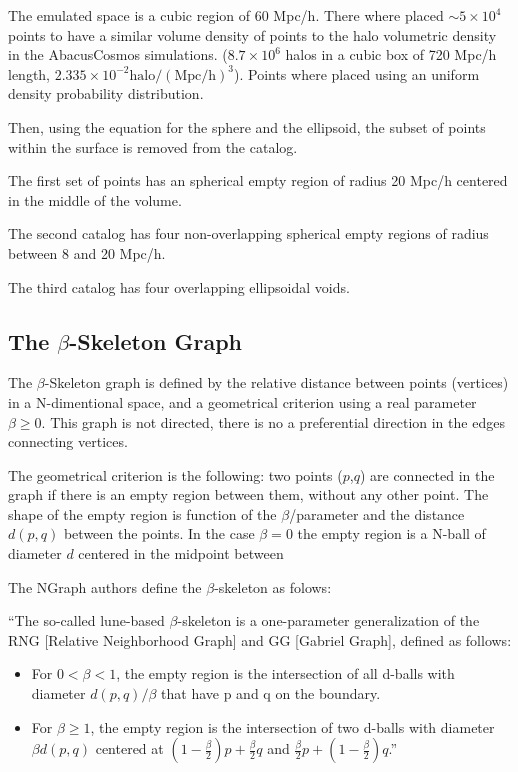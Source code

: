 \documentclass[preprint]{aastex62}
\begin{document}
The emulated space is a cubic region of 60 Mpc/h.
There where placed $\sim 5 \times10^4$ points to have a similar
volume density of points to the halo volumetric density in
the AbacusCosmos simulations. ($8.7\times10^6$ halos in a cubic
box of 720 Mpc/h length,
$2.335\times10^{-2}\mathrm{halo/(Mpc/h)^3}$).
Points where placed using an uniform density probability distribution.

Then, using the equation for the sphere and the ellipsoid, the subset
of points within the surface is removed from the catalog.

The first set of points has an spherical empty region of radius
20 Mpc/h centered in the middle of the volume.

The second catalog has four non-overlapping spherical empty
regions of radius between 8 and 20 Mpc/h.

The third catalog has four overlapping ellipsoidal voids.

\subsection{The $\beta$-Skeleton Graph}

The $\beta$-Skeleton graph is defined by the relative distance
between points (vertices) in a N-dimentional space, and a
geometrical criterion using a real
parameter $\beta\geq 0$. This graph is not directed, there is no
a preferential direction in the edges connecting vertices.

The geometrical criterion is the following:
two points ($p$,$q$) are connected in the graph if there is an empty region
between them, without any other point. The shape of the empty region
is function of the $\beta$/parameter and the distance $d(p,q)$ between the
points. In the case $\beta=0$ the empty region is a N-ball of
diameter $d$ centered in the midpoint between 

The NGraph authors define the $\beta$-skeleton as folows:

``The so-called lune-based $\beta$-skeleton is a one-parameter
generalization of the RNG [Relative Neighborhood Graph] and
GG [Gabriel Graph], defined as follows:

\begin{itemize}
\item For $0<\beta<1$, the empty region is the intersection of all
  d-balls with diameter $d(p,q) / \beta$ that have p and q on the
  boundary.
\item For $\beta \geq 1$, the empty region is the intersection of
  two d-balls with diameter $\beta d(p,q)$ centered at
  $(1-\frac{\beta}{2})p + \frac{\beta}{2}q$ and
  $\frac{\beta}{2}p + (1-\frac{\beta}{2})q$.''
\end{itemize}
  
\end{document}
